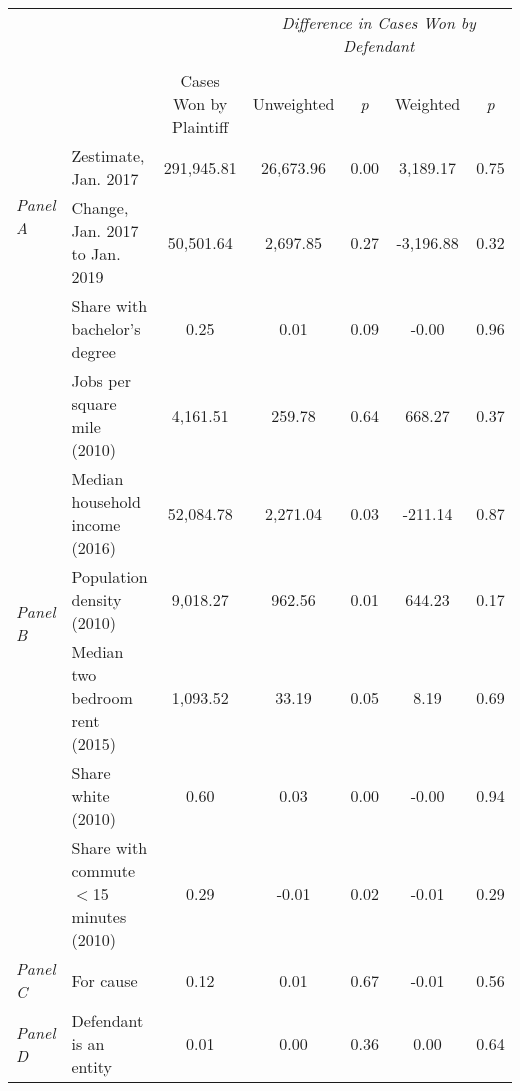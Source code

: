 \begin{tabular}{llccccc}
\toprule
 &  & \textit{} & \multicolumn{4}{c}{\textit{Difference in Cases Won by Defendant}} \\
\cline{4-7}
\\
 &  & Cases Won by Plaintiff & Unweighted & \emph{p} & Weighted & \emph{p} \\
\midrule
\multirow[c]{2}{3cm}{\textit{Panel A}} & Zestimate, Jan. 2017 & 291,945.81 & 26,673.96 & 0.00 & 3,189.17 & 0.75 \\
 & Change, Jan. 2017 to Jan. 2019 & 50,501.64 & 2,697.85 & 0.27 & -3,196.88 & 0.32 \\
\cline{1-7}
\multirow[c]{7}{3cm}{\textit{Panel B}} & Share with bachelor's degree & 0.25 & 0.01 & 0.09 & -0.00 & 0.96 \\
 & Jobs per square mile (2010) & 4,161.51 & 259.78 & 0.64 & 668.27 & 0.37 \\
 & Median household income (2016) & 52,084.78 & 2,271.04 & 0.03 & -211.14 & 0.87 \\
 & Population density (2010) & 9,018.27 & 962.56 & 0.01 & 644.23 & 0.17 \\
 & Median two bedroom rent (2015) & 1,093.52 & 33.19 & 0.05 & 8.19 & 0.69 \\
 & Share white (2010) & 0.60 & 0.03 & 0.00 & -0.00 & 0.94 \\
 & Share with commute $<$15 minutes (2010) & 0.29 & -0.01 & 0.02 & -0.01 & 0.29 \\
\cline{1-7}
\textit{Panel C} & For cause & 0.12 & 0.01 & 0.67 & -0.01 & 0.56 \\
\cline{1-7}
\textit{Panel D} & Defendant is an entity & 0.01 & 0.00 & 0.36 & 0.00 & 0.64 \\
\cline{1-7}
\bottomrule
\end{tabular}
